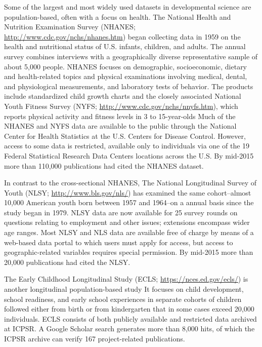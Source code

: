 \documentclass[letterpaper,man,apacite,natbib]{apa6}
\begin{document}
Some of the largest and most widely used datasets in developmental science are population-based, often with a focus on health.
The National Health and Nutrition Examination Survey (NHANES; \url{http://www.cdc.gov/nchs/nhanes.htm}) began collecting data in 1959 on the health and nutritional status of U.S. infants, children, and adults. 
The annual survey combines interviews with a geographically diverse representative sample of about 5,000 people.
NHANES focuses on demographic, socioeconomic, dietary and health-related topics and physical examinations involving medical, dental, and physiological measurements, and laboratory tests of behavior.
The products include standardized child growth charts and the closely associated National Youth Fitness Survey (NYFS; \url{http://www.cdc.gov/nchs/nnyfs.htm}), which reports physical activity and fitness levels in 3 to 15-year-olds
Much of the NHANES and NYFS data are available to the public through the National Center for Health Statistics at the U.S. Centers for Disease Control.
However, access to some data is restricted, available only to individuals via one of the 19 Federal Statistical Research Data Centers locations across the U.S.
By mid-2015 more than 110,000 publications had cited the NHANES dataset.

In contrast to the cross-sectional NHANES, The National Longitudinal Survey of Youth (NLSY; \url{http://www.bls.gov/nls/}) has examined the same cohort--almost 10,000 American youth born between 1957 and 1964--on a annual basis since the study began in 1979.
NLSY data are now available for 25 survey rounds on questions relating to employment and other issues; extensions encompass wider age ranges.
Most NLSY and NLS data are available free of charge by means of a web-based data portal to which users must apply for access, but access to geographic-related variables requires special permission.
By mid-2015 more than 20,000 publications had cited the NLSY.

The Early Childhood Longitudinal Study (ECLS; \url{https://nces.ed.gov/ecls/}) is another longitudinal population-based study 
It focuses on child development, school readiness, and early school experiences in separate cohorts of children followed either from birth or from kindergarten that in some cases exceed 20,000 individuals.
ECLS consists of both publicly available and restricted data archived at ICPSR.
A Google Scholar search generates more than 8,000 hits, of which the ICPSR archive can verify 167 project-related publications.
\end{document}
